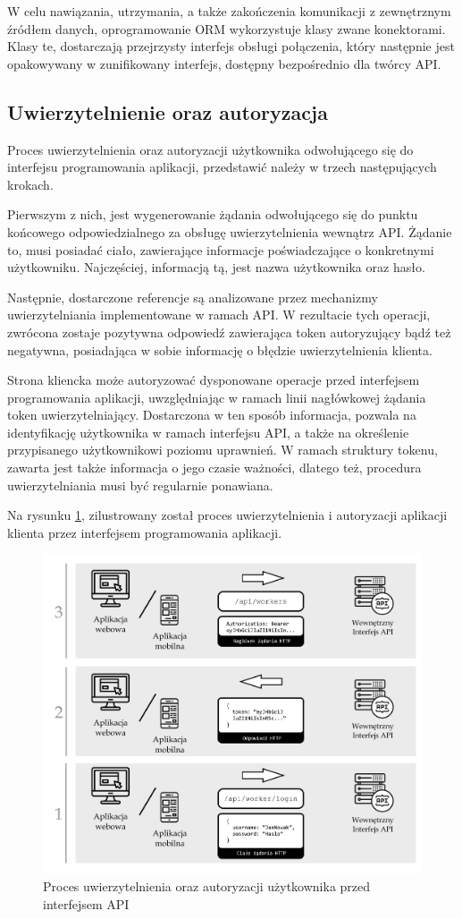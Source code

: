 W celu nawiązania, utrzymania, a także zakończenia komunikacji z zewnętrznym źródłem danych, oprogramowanie ORM wykorzystuje klasy zwane konektorami. Klasy te, dostarczają przejrzysty interfejs obsługi połączenia, który następnie jest opakowywany w zunifikowany interfejs, dostępny bezpośrednio dla twórcy API.

\subsection*{Uwierzytelnienie oraz autoryzacja}
Proces uwierzytelnienia oraz autoryzacji użytkownika odwołującego się do interfejsu programowania aplikacji, przedstawić należy w trzech następujących krokach.

Pierwszym z nich, jest wygenerowanie żądania odwołującego się do punktu końcowego odpowiedzialnego za obsługę uwierzytelnienia wewnątrz API. Żądanie to, musi posiadać ciało, zawierające informacje poświadczające o konkretnymi użytkowniku. Najczęściej, informacją tą, jest nazwa użytkownika oraz hasło.

Następnie, dostarczone referencje są analizowane przez mechanizmy uwierzytelniania implementowane w ramach API. W rezultacie tych operacji, zwrócona zostaje pozytywna odpowiedź zawierająca token autoryzujący bądź też negatywna, posiadająca w sobie informację o błędzie uwierzytelnienia klienta.

Strona kliencka może autoryzować dysponowane operacje przed interfejsem programowania aplikacji, uwzględniając w ramach linii nagłówkowej żądania token uwierzytelniający. Dostarczona w ten sposób informacja, pozwala na identyfikację użytkownika w ramach interfejsu API, a także na określenie przypisanego użytkownikowi poziomu uprawnień. W ramach struktury tokenu, zawarta jest także informacja o jego czasie ważności, dlatego też, procedura uwierzytelniania musi być regularnie ponawiana.

Na rysunku \ref{fig:uwierzytelnienie-autoryzacja}, zilustrowany został proces uwierzytelnienia i autoryzacji aplikacji klienta przez interfejsem programowania aplikacji. 

\begin{figure}[ht]
 \centering
  \includegraphics[width=0.6\linewidth]{rys02/uwierzytelnianie-autoryzacja}
 \caption{Proces uwierzytelnienia oraz autoryzacji użytkownika przed interfejsem API}
 \label{fig:uwierzytelnienie-autoryzacja}
\end{figure}


